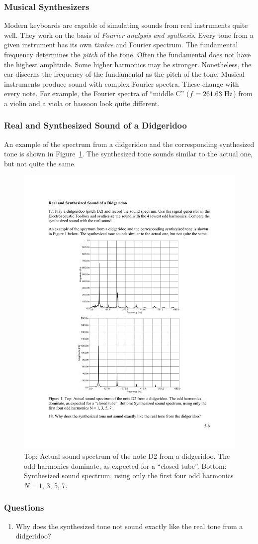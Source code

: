 \documentclass[11pt]{NSF}
\def\ben{\begin{enumerate}}
\def\een{\end{enumerate}}
\def\i{\item{}}
\begin{document}
\subsubsection{Musical Synthesizers}

Modern keyboards are capable of simulating sounds from real 
instruments quite well. 
They work on the basis of {\em Fourier analysis and synthesis}. 
Every tone from a given instrument has its own {\em timbre} 
and Fourier spectrum. 
The fundamental frequency determines the {\em pitch} of the tone. 
Often the fundamental does not have the highest amplitude. 
Some higher harmonics may be stronger. 
Nonetheless, the ear discerns the frequency of the fundamental 
as the pitch of the tone. 
Musical instruments produce sound with complex Fourier spectra. 
These change with every note. 
For example, the Fourier spectra of ``middle C” ($f = 261.63~{\rm Hz}$) 
from a violin and a viola or bassoon look quite different.

\subsubsection{Real and Synthesized Sound of a Didgeridoo}

An example of the spectrum from a didgeridoo and the 
corresponding synthesized tone is shown in Figure~\ref{f:1}. 
The synthesized tone sounds similar to the actual one, but not quite the same.
%
\begin{figure}[hbtp]
\begin{center}
\includegraphics[width=.7\textwidth]{fig5_1}
\caption{Top: Actual sound spectrum of the note D2 from a didgeridoo. 
The odd harmonics dominate, as expected for a ``closed tube”. 
Bottom: Synthesized sound spectrum, using only the first four odd harmonics 
$N = 1$, 3, 5, 7.}
\label{f:1} 
\end{center} 
\end{figure}
%

\subsubsection*{Questions}
\ben
\i Why does the synthesized tone not sound
exactly like the real tone from a didgeridoo?
\een
\end{document}
